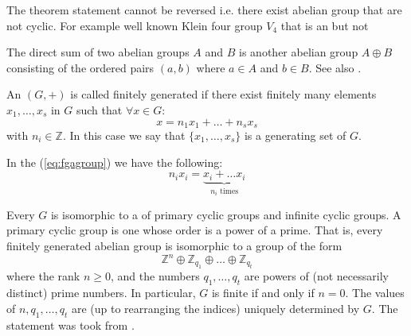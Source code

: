 \begin{appendices}
\begin{remark}
  The theorem statement cannot be reversed i.e. there exist abelian
  group that are not cyclic. For example well known Klein four group
  $V_4$ \cite{wiki:klein4group} that is an
   but not   
\end{remark}

\begin{definition}
  The direct sum of two abelian groups $A$ and
  $B$ is another abelian group $A \oplus B$ consisting of the ordered
  pairs
  $\left(a, b\right)$ where $a \in A$ and $b \in B$.
  \cite{wiki:directsum}
  See also .
  
  \label{def:directsum}
\end{definition}

\begin{definition}
  An  $(G, +)$ is called finitely generated
  \cite{wiki:fgagroup} 
  if there exist finitely many elements $x_1, \dots, x_s$ in $G$ such that
  $\forall x \in G$:
  \begin{equation}
    x = n_1 x_1 + \dots + n_s x_s
    \label{eq:fgagroup}
  \end{equation}
  with $n_i \in \mathbb{Z}$. In this case we say that $\{x_1, \dots,
  x_s\}$ is a generating set of $G$.

  In the (\ref{eq:fgagroup}) we have the following:
  \[
  n_i x_i = \underbrace{x_i + \dots x_i}_{n_i \text{ times}}
  \]
  \label{def:fgagroup}
\end{definition}

\begin{theorem}
  Every  $G$ is isomorphic to a
   of primary cyclic groups and infinite cyclic
  groups. A primary cyclic group is one whose order is a power of a
  prime. That is, every finitely generated abelian group is isomorphic
  to a group of the form
  \[
  \mathbb{Z}^n \oplus \mathbb{Z}_{q_1} \oplus
  \dots \oplus \mathbb{Z}_{q_t}
  \]
  where the rank $n \ge 0$, and the numbers $q_1, \dots , q_t$ are
  powers of (not 
  necessarily distinct) prime numbers. In particular, $G$ is finite if
  and only if $n = 0$. The values of $n, q_1, \dots , q_t$ are (up to
  rearranging the indices) uniquely determined by $G$. 
  The statement was took from \cite{wiki:fgagroup}.
  \label{thm:fgagroup}
\end{theorem}


\end{appendices}
